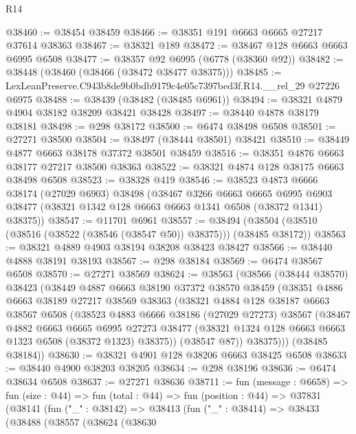 \begin{lexlean}{R14}
\begin{coremodule}
@38460 := @38454 @38459
@38466 := @38351 @191 @6663 @6665 @27217 @37614 @38363
@38467 := @38321 @189
@38472 := @38467 @128 @6663 @6663 @6995 @6508
@38477 := @38357 @92 @6995 (@6778 (@38360 @92))
@38482 := @38448 (@38460 (@38466 (@38472 @38477 @38375)))
@38485 := LexLeanPreserve.C943b8de9b0bdb9179c4e05c7397bed3f.R14.__rel_29 @27226 @6975
@38488 := @38439 (@38482 (@38485 @6961))
@38494 := @38321 @4879 @4904 @38182 @38209 @38421 @38428
@38497 := @38440 @4878 @38179 @38181
@38498 := @298 @38172
@38500 := @6474 @38498 @6508
@38501 := @27271 @38500
@38504 := @38497 (@38444 @38501) @38421
@38510 := @38449 @4877 @6663 @38178 @37372 @38501 @38459
@38516 := @38351 @4876 @6663 @38177 @27217 @38500 @38363
@38522 := @38321 @4874 @128 @38175 @6663 @38498 @6508
@38523 := @38328 @419
@38546 := @38523
    @4873
    @6666
    @38174
    (@27029 @6903)
    @38498
    (@38467
      @3266
      @6663
      @6665
      @6995
      @6903
      @38477
      (@38321 @1342 @128 @6663 @6663 @1341 @6508 (@38372 @1341) @38375))
@38547 := @11701 @6961
@38557 := @38494 (@38504 (@38510 (@38516 (@38522 (@38546 (@38547 @50)) @38375))) (@38485 @38172))
@38563 := @38321 @4889 @4903 @38194 @38208 @38423 @38427
@38566 := @38440 @4888 @38191 @38193
@38567 := @298 @38184
@38569 := @6474 @38567 @6508
@38570 := @27271 @38569
@38624 := @38563
    (@38566
      (@38444 @38570)
      @38423
      (@38449
        @4887
        @6663
        @38190
        @37372
        @38570
        @38459
        (@38351
          @4886
          @6663
          @38189
          @27217
          @38569
          @38363
          (@38321
            @4884
            @128
            @38187
            @6663
            @38567
            @6508
            (@38523
              @4883
              @6666
              @38186
              (@27029 @27273)
              @38567
              (@38467
                @4882
                @6663
                @6665
                @6995
                @27273
                @38477
                (@38321 @1324 @128 @6663 @6663 @1323 @6508 (@38372 @1323) @38375))
              (@38547 @87))
            @38375)))
      (@38485 @38184))
@38630 := @38321 @4901 @128 @38206 @6663 @38425 @6508
@38633 := @38440 @4900 @38203 @38205
@38634 := @298 @38196
@38636 := @6474 @38634 @6508
@38637 := @27271 @38636
@38711 := fun (message : @6658) =>
  fun (size : @44) =>
  fun (total : @44) =>
  fun (position : @44) =>
  @37831
    (@38141
      (fun ("_" : @38142) =>
      @38413
        (fun ("_" : @38414) =>
        @38433
          (@38488
            (@38557
              (@38624
                (@38630

\end{coremodule}
\end{lexlean}
